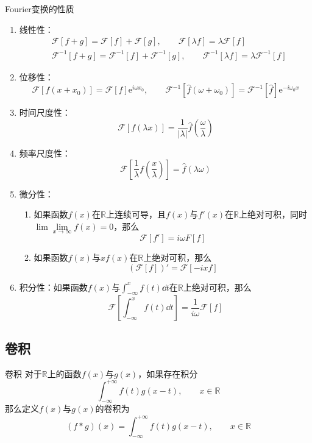 \documentclass[lang = cn, scheme = chinese, thmcnt = section]{elegantbook}
\newcommand{\R}{\mathbb{R}}            %
\newcommand{\dis}{\displaystyle}
\newcommand{\ee}[1]{\mathrm{e}^{#1}}
\begin{document}
\begin{theorem}{Fourier变换的性质}
	\begin{enumerate}
		\item 线性性：
		\begin{align*}
			& \mathscr{F}[f+g]=\mathscr{F}[f]+\mathscr{F}[g],\qquad \mathscr{F}[\lambda f]=\lambda \mathscr{F}[f]\\
			& \mathscr{F}^{-1}[f+g]=\mathscr{F}^{-1}[f]+\mathscr{F}^{-1}[g],\qquad \mathscr{F}^{-1}[\lambda f]=\lambda \mathscr{F}^{-1}[f]
		\end{align*}
		\item 位移性：
		$$
		\mathscr{F}[f(x+x_0)]=\mathscr{F}[f]\ee{i\omega x_0},\qquad 
		\mathscr{F}^{-1}[\hat{f}(\omega+\omega_0)]=\mathscr{F}^{-1}[\hat{f}]\ee{-i\omega_0 x}
		$$
		\item 时间尺度性：
		$$
		\mathscr{F}[f(\lambda x)]=\frac{1}{|\lambda|}\hat{f}\left(\frac{\omega}{\lambda }\right)
		$$
		\item 频率尺度性：
		$$
		\mathscr{F}\left[ \frac{1}{\lambda }f\left(\frac{x}{\lambda }\right) \right]=\hat{f}(\lambda \omega)
		$$
		\item 微分性：
		\begin{enumerate}
			\item 如果函数$f(x)$在$\R$上连续可导，且$f(x)$与$f'(x)$在$\R$上绝对可积，同时$\lim\lim\limits_{x\to\infty}f(x)=0$，那么
			$$
			\mathscr{F}[f']=i\omega F[f]
			$$
			\item 如果函数$f(x)$与$xf(x)$在$\R$上绝对可积，那么
			$$
			(\mathscr{F}[f])'=\mathscr{F}[-ixf]
			$$
		\end{enumerate}
		\item 积分性：如果函数$f(x)$与$\dis\int_{-\infty}^{x}f(t)\dd t$在$\R$上绝对可积，那么
		$$
		\mathscr{F}\left[ \int_{-\infty}^{x}f(t)\dd t \right]=\frac{1}{i\omega}\mathscr{F}[f]
		$$
	\end{enumerate}
\end{theorem}

\subsection{卷积}

\begin{definition}{卷积}
	对于$\R$上的函数$f(x)$与$g(x)$，如果存在积分
	$$
	\int_{-\infty}^{+\infty}f(t)g(x-t),\qquad x\in\R
	$$
	那么定义$f(x)$与$g(x)$的卷积为
	$$
	(f*g)(x)=\int_{-\infty}^{+\infty}f(t)g(x-t),\qquad x\in\R
	$$
\end{definition}
\end{document}
